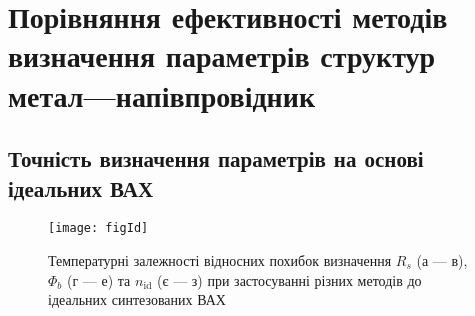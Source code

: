 \section{Порівняння ефективності методів визначення параметрів структур метал---напівпровідник}

\subsection{Точність визначення параметрів на основі ідеальних ВАХ}

\begin{figure}
\center
\texttt{[image: figId]}%
\caption{\label{figId}
Температурні залежності відносних похибок визначення $R_s$ (а --- в), $\Phi_b$ (г --- е) та $n_\mathrm{id}$ (є --- з) при застосуванні різних методів до ідеальних синтезованих ВАХ
}
\end{figure}

